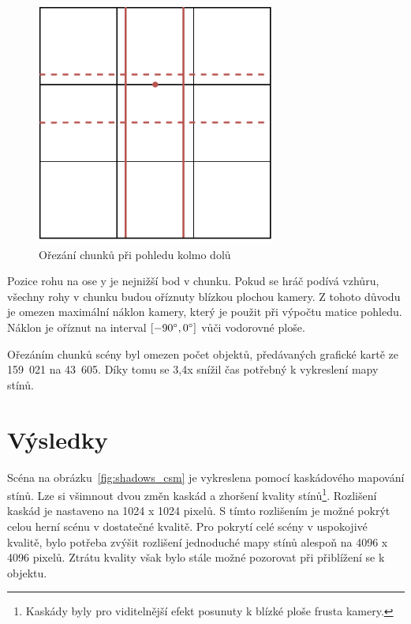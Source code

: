 \documentclass[thesis=M,czech]{FITthesis}[2019/12/23]
\begin{document}
\begin{figure}\centering
	\includegraphics[width=0.7\textwidth]{images/visible_chunks_camera_down}
	\caption[Ořezání chunků při pohledu kolmo dolů]{Ořezání chunků při pohledu kolmo dolů}\label{fig:visible_chunks_down}
\end{figure}

Pozice rohu na ose y je nejnižší bod v chunku. Pokud se hráč podívá vzhůru, všechny rohy v chunku budou oříznuty blízkou plochou kamery. Z tohoto důvodu je omezen maximální náklon kamery, který je použit při výpočtu matice pohledu. Náklon je oříznut na interval $[-90\degree, 0\degree]$ vůči vodorovné ploše.

Ořezáním chunků scény byl omezen počet objektů, předávaných grafické kartě ze 159~021 na 43~605. Díky tomu se 3,4x snížil čas potřebný k vykreslení mapy stínů.

\section{Výsledky}

Scéna na obrázku~\ref{fig:shadows_csm} je vykreslena pomocí kaskádového mapování stínů. Lze si všimnout dvou změn kaskád a zhoršení kvality stínů\footnote{Kaskády byly pro viditelnější efekt posunuty k blízké ploše frusta kamery.}. Rozlišení kaskád je nastaveno na 1024 x 1024 pixelů. S tímto rozlišením je možné pokrýt celou herní scénu v dostatečné kvalitě. Pro pokrytí celé scény v uspokojivé kvalitě, bylo potřeba zvýšit rozlišení jednoduché mapy stínů alespoň na 4096 x 4096 pixelů. Ztrátu kvality však bylo stále možné pozorovat při přiblížení se k objektu.
\end{document}
